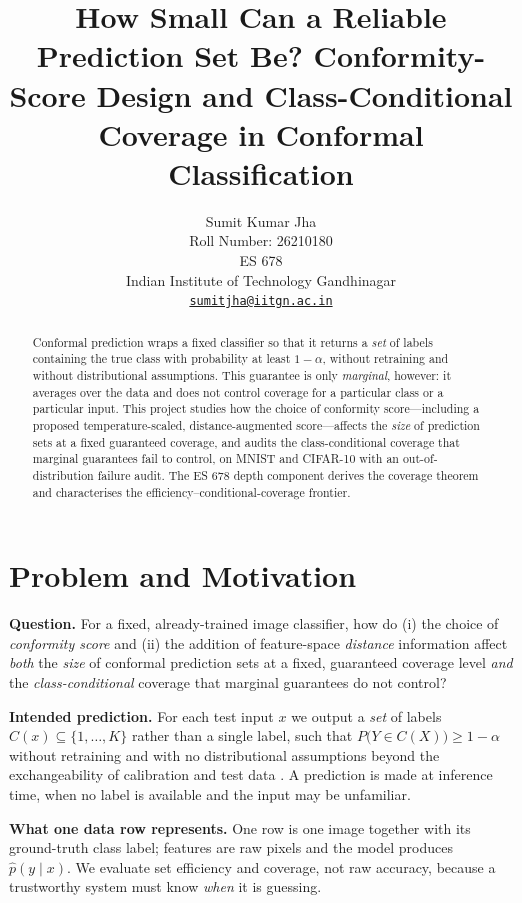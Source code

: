 \documentclass{article}
\title{How Small Can a Reliable Prediction Set Be? Conformity-Score Design and
Class-Conditional Coverage in Conformal Classification}
\author{%
  Sumit Kumar Jha \\
  Roll Number: 26210180 \\
  ES 678 \\
  Indian Institute of Technology Gandhinagar \\
  \href{mailto:sumitjha@iitgn.ac.in}{\texttt{sumitjha@iitgn.ac.in}}
}
\begin{document}
\maketitle

\begin{abstract}
Conformal prediction wraps a fixed classifier so that it returns a \emph{set} of labels containing
the true class with probability at least $1-\alpha$, without retraining and without distributional
assumptions. This guarantee is only \emph{marginal}, however: it averages over the data and does not
control coverage for a particular class or a particular input. This project studies how the choice of
conformity score---including a proposed temperature-scaled, distance-augmented score---affects the
\emph{size} of prediction sets at a fixed guaranteed coverage, and audits the class-conditional
coverage that marginal guarantees fail to control, on MNIST and CIFAR-10 with an out-of-distribution
failure audit. The ES 678 depth component derives the coverage theorem and characterises the
efficiency--conditional-coverage frontier.
\end{abstract}

\section{Problem and Motivation}
\textbf{Question.} For a fixed, already-trained image classifier, how do (i) the choice of
\emph{conformity score} and (ii) the addition of feature-space \emph{distance} information affect
\emph{both} the \emph{size} of conformal prediction sets at a fixed, guaranteed coverage level
\emph{and} the \emph{class-conditional} coverage that marginal guarantees do not control?

\textbf{Intended prediction.} For each test input $x$ we output a \emph{set} of labels
$C(x)\subseteq\{1,\dots,K\}$ rather than a single label, such that $P\big(Y\in C(X)\big)\ge 1-\alpha$
without retraining and with no distributional assumptions beyond the exchangeability of calibration
and test data \citep{vovk2005algorithmic,shafer2008tutorial}. A prediction is made at inference time,
when no label is available and the input may be unfamiliar.

\textbf{What one data row represents.} One row is one image together with its ground-truth class
label; features are raw pixels and the model produces $\hat p(y\mid x)$. We evaluate set efficiency
and coverage, not raw accuracy, because a trustworthy system must know \emph{when} it is guessing.
\end{document}
